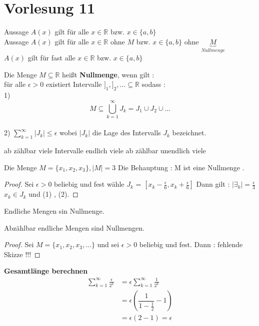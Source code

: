 \section{Vorlesung 11}
\begin{remark}
Aussage $A(x)$ gilt für alle $x \in \mathbb{R}$ bzw. $x \in \{ a , b\}$\\
Aussage $A(x)$ gilt für alle $x \in \mathbb{R}$ ohne $ M$ bzw. $x \in \{ a , b \}$ ohne $\underbrace{M}_{Nullmenge} $\\
$A(x)$ gilt für fast alle $x \in \mathbb{R}$ bzw. $x \in \{ a , b\} $  
\end{remark}
\begin{definition}[Nullmenge]
Die Menge $M \subseteq \mathbb{R}$ heißt \textbf{Nullmenge}, wenn gilt :\\
für alle $\epsilon > 0$ existiert Intervalle $ ]_1 , ]_2 , \dots \subseteq \mathbb{R}$ sodass :\\
1) $$ M \subseteq \bigcup_{k=1}^{\infty} J_k = J_1 \cup J_2 \cup \dots $$\\
2) $ \sum_{k=1}^{\infty}|J_k| \leq \epsilon$ wobei $|J_k|$ die Lage des Intervalls $J_k$ bezeichnet.
\end{definition}
\begin{remark}
ab zählbar viele Intervalle endlich viele
ab zählbar unendlich viele
\end{remark}
\begin{example}[1] 
Die Menge $ M = \{ x_1 , x_2 , x_3 \}, |M| = 3$ Die Behauptung : M ist eine Nullmenge .  
\end{example}
\begin{proof}
Sei $\epsilon > 0 $ beliebig und fest 
wähle $J_k$ = $[x_k - \frac{\epsilon}{6}, x_k + \frac{\epsilon}{6}]$
Dann gilt : $|\exists_k|=\frac{\epsilon}{3}$  $x_k \in J_k$ und (1) , (2).
\end{proof}  
\begin{remark}
Endliche Mengen sin Nullmenge.
\end{remark}
\begin{remark}
Abzählbar endliche Mengen sind Nullmengen.
\end{remark}
\begin{proof}
Sei $ M = \{ x_1 , x_2 , x_3 , \dots \}$ und sei $\epsilon > 0 $ beliebig und fest. Dann :
fehlende Skizze !!! 
\end{proof}
\textbf{Gesamtlänge berechnen}
\begin{align*}
\sum_{k=1}^{\infty}{\frac{\epsilon}{2^k}} &= \epsilon \sum_{k=1}^{\infty}{\frac{1}{2^k}}\\
&= \epsilon (\dfrac{1}{1-\frac{1}{2}}-1)\\
&= \epsilon(2-1)= \epsilon
\end{align*}
